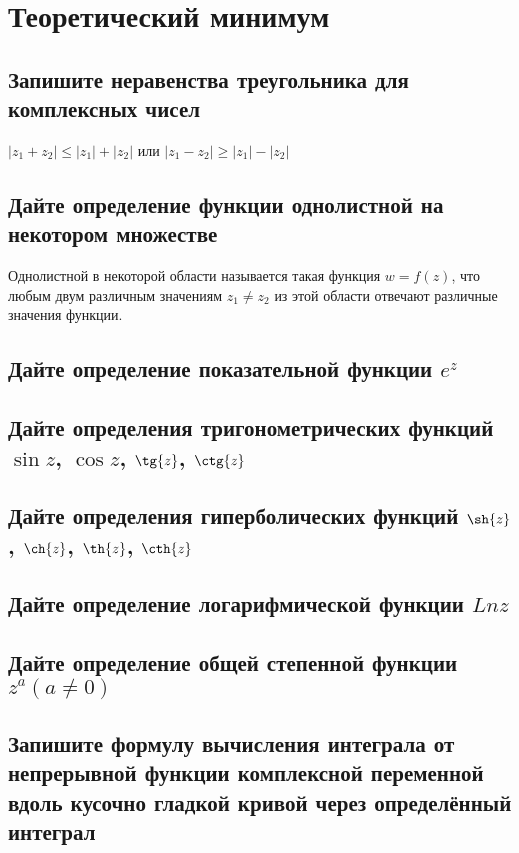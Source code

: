 \section{Теоретический минимум}

\subsection{Запишите неравенства треугольника для комплексных чисел}
$|z_1+z_2|\leqslant|z_1|+|z_2|$ или $|z_1-z_2|\geqslant|z_1|-|z_2|$

\subsection{Дайте определение функции однолистной на некотором множестве}
Однолистной в некоторой области называется такая функция $w=f(z)$, что любым двум различным значениям $z_1 \neq z_2$ из этой области отвечают различные значения функции.

\subsection{Дайте определение показательной функции $e^z$}

\subsection{Дайте определения тригонометрических функций $\sin{z}$, $\cos{z}$, $\tg{z}$, $\ctg{z}$}

\subsection{Дайте определения гиперболических функций $\sh{z}$, $\ch{z}$, $\th{z}$, $\cth{z}$}

\subsection{Дайте определение логарифмической функции $Ln z$}

\subsection{Дайте определение общей степенной функции $z^a (a\neq0)$ }

\subsection{Запишите формулу вычисления интеграла от непрерывной функции комплексной переменной вдоль кусочно гладкой кривой через определённый интеграл}

